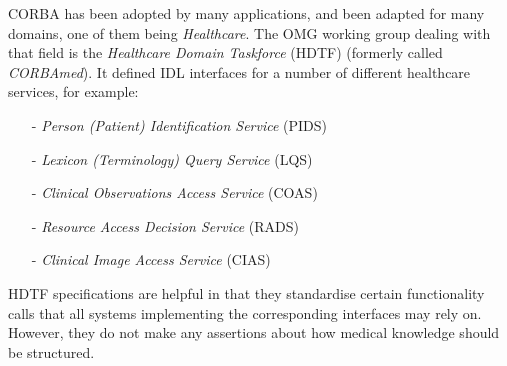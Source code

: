 CORBA has been adopted by many applications, and been adapted for many domains,
one of them being \emph{Healthcare}. The OMG working group dealing with that
field is the \emph{Healthcare Domain Taskforce} (HDTF) \cite{omghdtf} (formerly
called \emph{CORBAmed}). It defined IDL interfaces for a number of different
healthcare services, for example:

\begin{itemize}
    \item[-] \emph{Person (Patient) Identification Service} (PIDS)
    \item[-] \emph{Lexicon (Terminology) Query Service} (LQS)
    \item[-] \emph{Clinical Observations Access Service} (COAS)
    \item[-] \emph{Resource Access Decision Service} (RADS)
    \item[-] \emph{Clinical Image Access Service} (CIAS)
\end{itemize}

HDTF specifications are helpful in that they standardise certain functionality
calls that all systems implementing the corresponding interfaces may rely on.
However, they do not make any assertions about how medical knowledge should be
structured.
